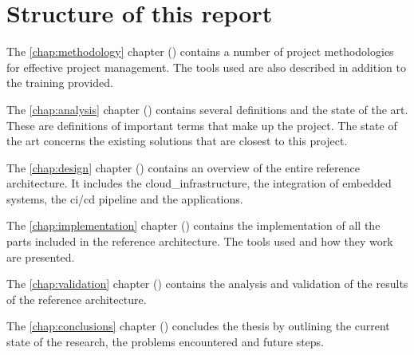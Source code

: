 \section{Structure of this report}

The \ref{chap:methodology} chapter () contains a number of project methodologies for effective project management. The tools used are also described in addition to the training provided.

The \ref{chap:analysis} chapter () contains several definitions and the state of the art. These are definitions of important terms that make up the project. The state of the art concerns the existing solutions that are closest to this project.

The \ref{chap:design} chapter () contains an overview of the entire reference architecture. It includes the \gls{cloud_infrastructure}, the integration of embedded systems, the \acrshort{ci}/\acrshort{cd} pipeline and the applications.

The \ref{chap:implementation} chapter () contains the implementation of all the parts included in the reference architecture. The tools used and how they work are presented.

The \ref{chap:validation} chapter () contains the analysis and validation of the results of the reference architecture.

The \ref{chap:conclusions} chapter () concludes the thesis by outlining the current state of the research, the problems encountered and future steps.